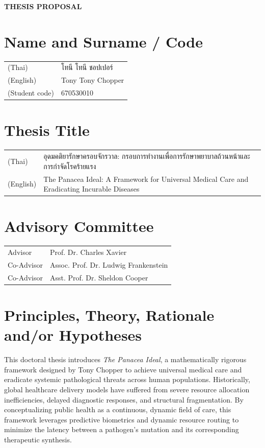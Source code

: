 \documentclass{../class/cscmugradthesis}
\newlength{\labelcolwidth}
\newlength{\contentcolwidth}
\newlength{\titlecolwidth}
\begin{document}

\begin{center}
    {\Large\bfseries THESIS PROPOSAL}
    \vspace*{0.5cm}
\end{center}

\section{Name and Surname / Code}
\begin{tabular}{@{}p{}@{}p{\contentcolwidth}@{}}
(Thai)          & {\small โทนี โทนี ชอปเปอร์} \\
(English)       & Tony Tony Chopper \\
(Student code)  & 670530010
\end{tabular}

\section{Thesis Title}
\begin{tabular}{@{}p{}@{}p{\titlecolwidth}@{}}
(Thai)          & {\small อุดมคติยารักษาครอบจักรวาล: กรอบการทำงานเพื่อการรักษาพยาบาลถ้วนหน้าและการกำจัดโรคร้ายแรง} \\
(English)       & The Panacea Ideal: A Framework for Universal Medical Care and Eradicating Incurable Diseases \\
\end{tabular}

\section{Advisory Committee}
\begin{tabular}{@{}p{}@{}p{\contentcolwidth}@{}}
Advisor & Prof. Dr. Charles Xavier  \\
Co-Advisor & Assoc. Prof. Dr. Ludwig Frankenstein \\
Co-Advisor & Asst. Prof. Dr. Sheldon Cooper 
\end{tabular}

\section{Principles, Theory, Rationale and/or Hypotheses}
This doctoral thesis introduces \textit{The Panacea Ideal}, a mathematically rigorous framework designed by Tony Chopper to achieve universal medical care and eradicate systemic pathological threats across human populations. Historically, global healthcare delivery models have suffered from severe resource allocation inefficiencies, delayed diagnostic responses, and structural fragmentation. By conceptualizing public health as a continuous, dynamic field of care, this framework leverages predictive biometrics and dynamic resource routing to minimize the latency between a pathogen's mutation and its corresponding therapeutic synthesis. 
\end{document}
